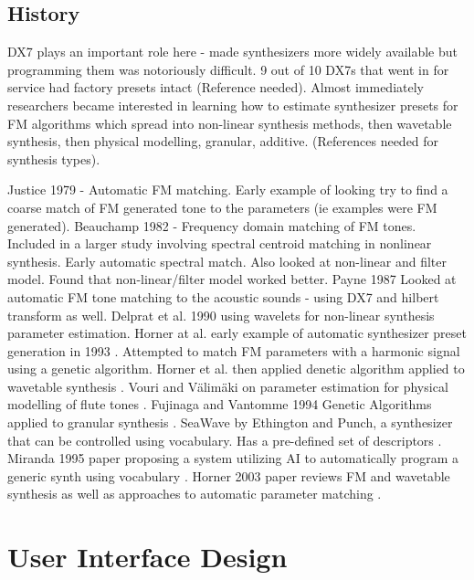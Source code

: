 \subsection{History}
DX7 plays an important role here - made synthesizers more widely available but programming them was notoriously difficult. 9 out of 10 DX7s that went in for service had factory presets intact (Reference needed). Almost immediately researchers became interested in learning how to estimate synthesizer presets for FM algorithms which spread into non-linear synthesis methods, then wavetable synthesis, then physical modelling, granular, additive. (References needed for synthesis types). 

Justice 1979 \cite{justice1979analytic}  - Automatic FM matching. Early example of looking try to find a coarse match of FM generated tone to the parameters (ie examples were FM generated). Beauchamp 1982 \cite{beauchamp1982synthesis} - Frequency domain matching of FM tones. Included in a larger study involving spectral centroid matching in nonlinear synthesis. Early automatic spectral match. Also looked at non-linear and filter model. Found that non-linear/filter model worked better. Payne 1987 \cite{payne1987microcomputer} Looked at automatic FM tone matching to the acoustic sounds - using DX7 and hilbert transform as well. Delprat et al. 1990 \cite{delprat1990parameter} using wavelets for non-linear synthesis parameter estimation. Horner at al. early example of automatic synthesizer preset generation in 1993 \cite{horner1993machine}. Attempted to match FM parameters with a harmonic signal using a genetic algorithm. Horner et al. then applied denetic algorithm applied to wavetable synthesis \cite{horner1993methods}. Vouri and V{\"a}lim{\"a}ki on parameter estimation for physical modelling of flute tones \cite{vuori1993parameter}. Fujinaga and Vantomme 1994 Genetic Algorithms applied to granular synthesis \cite{fujinaga1994genetic}. SeaWave by Ethington and Punch, a synthesizer that can be controlled using vocabulary. Has a pre-defined set of descriptors \cite{ethington1994seawave}. Miranda 1995 paper proposing a system utilizing AI to automatically program a generic synth using vocabulary \cite{miranda1995artificial}. Horner 2003 paper reviews FM and wavetable synthesis as well as approaches to automatic parameter matching \cite{horner2003auto}.


\section{User Interface Design}
